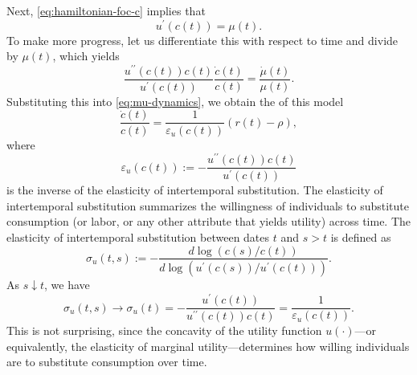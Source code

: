 \documentclass[\topdir/lecture\_notes.tex]{subfiles}
\begin{document}
Next, \eqref{eq:hamiltonian-foc-c} implies that
\begin{equation*}
  u^{\prime}(c(t))=\mu(t).
\end{equation*}
To make more progress, let us differentiate this with respect to time and divide by $\mu(t)$, which yields
\[
  \frac{u^{\prime \prime}(c(t)) c(t)}{u^{\prime}(c(t))} \frac{\dot{c}(t)}{c(t)}=\frac{\dot{\mu}(t)}{\mu(t)}.
\]
Substituting this into \eqref{eq:mu-dynamics}, we obtain the  of this model
\begin{equation}
  \frac{\dot{c}(t)}{c(t)}=\frac{1}{\varepsilon_{u}(c(t))}(r(t)-\rho),
  \label{eq:euler-consumption}
\end{equation}
where
\begin{equation*}
  \varepsilon_{u}(c(t)) :=-\frac{u^{\prime \prime}(c(t)) c(t)}{u^{\prime}(c(t))}
\end{equation*}
is the inverse of the elasticity of intertemporal substitution.
The elasticity of intertemporal substitution summarizes the willingness of individuals to substitute consumption (or labor, or any other attribute that yields utility) across time.
The elasticity of intertemporal substitution between dates $t$ and $s>t$ is defined as
\[
  \sigma_{u}(t, s):=-\frac{d \log (c(s) / c(t))}{d \log \left(u^{\prime}(c(s)) / u^{\prime}(c(t))\right)}.
\]
As $s \downarrow t$, we have
\begin{equation*}
  \sigma_{u}(t, s) \rightarrow \sigma_{u}(t)=-\frac{u^{\prime}(c(t))}{u^{\prime \prime}(c(t)) c(t)}=\frac{1}{\varepsilon_{u}(c(t))}.
\end{equation*}
This is not surprising, since the concavity of the utility function $u(\cdot)$---or equivalently, the elasticity of marginal utility---determines how willing individuals are to substitute consumption over time.
\end{document}
